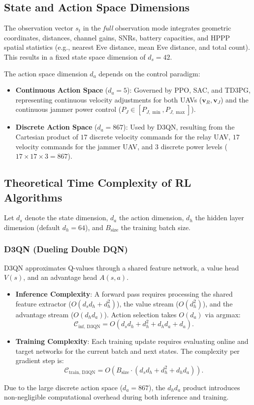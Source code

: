 \subsection{State and Action Space Dimensions}
The observation vector $s_t$ in the \textit{full} observation mode integrates geometric coordinates, distances, channel gains, SNRs, battery capacities, and HPPP spatial statistics (e.g., nearest Eve distance, mean Eve distance, and total count). This results in a fixed state space dimension of $d_s = 42$.

The action space dimension $d_a$ depends on the control paradigm:
\begin{itemize}
    \item \textbf{Continuous Action Space} ($d_a = 5$): Governed by PPO, SAC, and TD3PG, representing continuous velocity adjustments for both UAVs ($\mathbf{v}_R, \mathbf{v}_J$) and the continuous jammer power control ($P_J \in [P_{J,\min}, P_{J,\max}]$).
    \item \textbf{Discrete Action Space} ($d_a = 867$): Used by D3QN, resulting from the Cartesian product of $17$ discrete velocity commands for the relay UAV, $17$ velocity commands for the jammer UAV, and $3$ discrete power levels ($17 \times 17 \times 3 = 867$).
\end{itemize}

\subsection{Theoretical Time Complexity of RL Algorithms}
Let $d_s$ denote the state dimension, $d_a$ the action dimension, $d_h$ the hidden layer dimension (default $d_h = 64$), and $B_{\text{size}}$ the training batch size. 

\subsubsection{D3QN (Dueling Double DQN)}
D3QN approximates Q-values through a shared feature network, a value head $V(s)$, and an advantage head $A(s,a)$. 
\begin{itemize}
    \item \textbf{Inference Complexity}: A forward pass requires processing the shared feature extractor ($O(d_s d_h + d_h^2)$), the value stream ($O(d_h^2)$), and the advantage stream ($O(d_h d_a)$). Action selection takes $O(d_a)$ via argmax:
    \begin{equation}
        \mathcal{C}_{\text{inf, D3QN}} = O(d_s d_h + d_h^2 + d_h d_a + d_a).
    \end{equation}
    \item \textbf{Training Complexity}: Each training update requires evaluating online and target networks for the current batch and next states. The complexity per gradient step is:
    \begin{equation}
        \mathcal{C}_{\text{train, D3QN}} = O\left( B_{\text{size}} \cdot (d_s d_h + d_h^2 + d_h d_a) \right).
    \end{equation}
\end{itemize}
Due to the large discrete action space ($d_a = 867$), the $d_h d_a$ product introduces non-negligible computational overhead during both inference and training.

